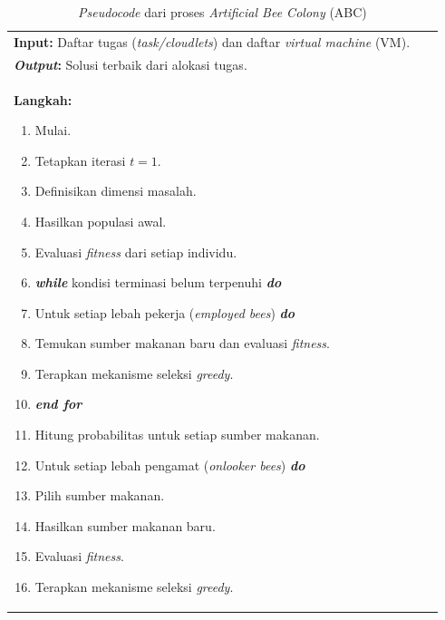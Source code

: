 \begin{table} [H]
    \centering
    \caption{\textit{Pseudocode} dari proses \textit{Artificial Bee Colony} (ABC)}
    \begin{tabular}{|p{0.95\linewidth}|}
    \hline
    \textbf{Input:} Daftar tugas (\textit{task/cloudlets}) dan daftar \textit{virtual machine} (VM). \\
    \textbf{\textit{Output}:} Solusi terbaik dari alokasi tugas. \\
    \textbf{Langkah:} 
    \begin{enumerate}[leftmargin=*,label=\arabic*.,itemsep=0pt,parsep=0pt]
        \item Mulai.
        \item Tetapkan iterasi $t = 1$.
        \item Definisikan dimensi masalah.
        \item Hasilkan populasi awal.
        \item Evaluasi \textit{fitness} dari setiap individu.
        \item \textbf{\textit{while}} kondisi terminasi belum terpenuhi \textbf{\textit{do}}
        \item \hspace{1em} Untuk setiap lebah pekerja (\textit{employed bees}) \textbf{\textit{do}}
        \item \hspace{2em} Temukan sumber makanan baru dan evaluasi \textit{fitness}.
        \item \hspace{2em} Terapkan mekanisme seleksi \textit{greedy}.
        \item \hspace{1em} \textbf{\textit{end for}}
        \item \hspace{1em} Hitung probabilitas untuk setiap sumber makanan.
        \item \hspace{1em} Untuk setiap lebah pengamat (\textit{onlooker bees}) \textbf{\textit{do}}
        \item \hspace{2em} Pilih sumber makanan.
        \item \hspace{2em} Hasilkan sumber makanan baru.
        \item \hspace{2em} Evaluasi \textit{fitness}.
        \item \hspace{2em} Terapkan mekanisme seleksi \textit{greedy}.

\end{enumerate}
\end{tabular}
\end{table}
